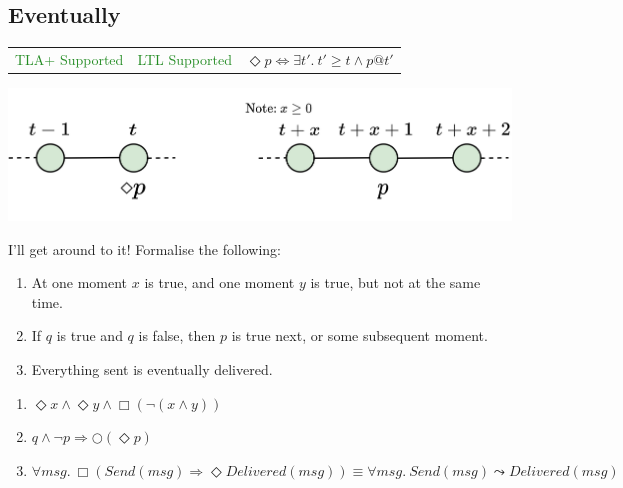 \subsection{Eventually}
\begin{tabular}{c | c r}
    \textcolor{ForestGreen}{TLA+ Supported} & \textcolor{ForestGreen}{LTL Supported} & $\Diamond p \Leftrightarrow \exists t' . \ t' \geq t \land p@t'$ \\
\end{tabular}
\begin{center}
    \includegraphics[width=.7\textwidth]{linear_time_logic/images/eventually_operator.drawio.png}
\end{center}
\begin{examplebox}{I'll get around to it!}
    Formalise the following:
    \begin{enumerate}
        \item At one moment $x$ is true, and one moment $y$ is true, but not at the same time.
        \item If $q$ is true and $q$ is false, then $p$ is true next, or some subsequent moment.
        \item Everything sent is eventually delivered.
    \end{enumerate}
    \tcblower
    \begin{enumerate}
        \item $\Diamond x \land \Diamond y \land \Box (\neg (x \land y))$
        \item $q \land \neg p \Rightarrow \bigcirc(\Diamond p)$
        \item $\forall msg . \ \Box(Send(msg) \Rightarrow \Diamond Delivered(msg)) \equiv \forall msg . \ Send(msg) \leadsto Delivered(msg)$
    \end{enumerate}
\end{examplebox}

